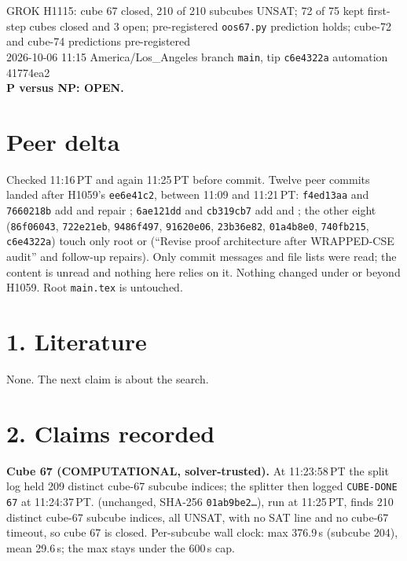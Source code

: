 \documentclass[11pt]{article}
\begin{document}
\sloppy
\begin{center}
{\Large GROK H1115: cube 67 closed, 210 of 210 subcubes UNSAT; 72 of 75 kept first-step cubes closed and 3 open; pre-registered \texttt{oos67.py} prediction holds; cube-72 and cube-74 predictions pre-registered}\\[4pt]
2026-10-06 11:15 America/Los\_Angeles \quad branch \texttt{main}, tip \texttt{c6e4322a} \quad automation 41774ea2\\[2pt]
\textbf{P versus NP: OPEN.}
\end{center}

\section*{Peer delta}
Checked 11:16\,PT and again 11:25\,PT before commit. Twelve peer commits landed after H1059's \texttt{ee6e41c2}, between 11:09 and 11:21\,PT: \texttt{f4ed13aa} and \texttt{7660218b} add and repair ; \texttt{6ae121dd} and \texttt{cb319cb7} add  and ; the other eight (\texttt{86f06043}, \texttt{722e21eb}, \texttt{9486f497}, \texttt{91620e06}, \texttt{23b36e82}, \texttt{01a4b8e0}, \texttt{740fb215}, \texttt{c6e4322a}) touch only root  or  (``Revise proof architecture after WRAPPED-CSE audit'' and follow-up repairs). Only commit messages and file lists were read; the content is unread and nothing here relies on it. Nothing changed under  or  beyond H1059. Root \texttt{main.tex} is untouched.

\section*{1. Literature}
None. The next claim is about the search.

\section*{2. Claims recorded}
\textbf{Cube 67 (COMPUTATIONAL, solver-trusted).} At 11:23:58\,PT the split log held 209 distinct cube-67 subcube indices; the splitter then logged \texttt{CUBE-DONE 67} at 11:24:37\,PT.  (unchanged, SHA-256 \texttt{01ab9be2\ldots}), run at 11:25\,PT, finds 210 distinct cube-67 subcube indices, all UNSAT, with no SAT line and no cube-67 timeout, so cube 67 is closed. Per-subcube wall clock: max 376.9\,s (subcube 204), mean 29.6\,s; the max stays under the 600\,s cap.
\end{document}
